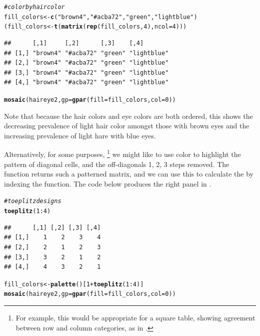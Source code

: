 \documentclass[11pt]{book}\usepackage[]{graphicx}\usepackage[]{color}
\makeatletter
\newcommand{\hlnum}[1]{\textcolor[rgb]{0.686,0.059,0.569}{#1}}%
\newcommand{\hlstr}[1]{\textcolor[rgb]{0.192,0.494,0.8}{#1}}%
\newcommand{\hlcom}[1]{\textcolor[rgb]{0.678,0.584,0.686}{\textit{#1}}}%
\newcommand{\hlopt}[1]{\textcolor[rgb]{0,0,0}{#1}}%
\newcommand{\hlstd}[1]{\textcolor[rgb]{0.345,0.345,0.345}{#1}}%
\newcommand{\hlkwb}[1]{\textcolor[rgb]{0.69,0.353,0.396}{#1}}%
\newcommand{\hlkwc}[1]{\textcolor[rgb]{0.333,0.667,0.333}{#1}}%
\newcommand{\hlkwd}[1]{\textcolor[rgb]{0.737,0.353,0.396}{\textbf{#1}}}%
\newenvironment{kframe}{%
 \def\at@end@of@kframe{}%
 \ifinner\ifhmode%
  \def\at@end@of@kframe{\end{minipage}}%
  \begin{minipage}{\columnwidth}%
 \fi\fi%
 \def\FrameCommand##1{\hskip\@totalleftmargin \hskip-\fboxsep
 \colorbox{shadecolor}{##1}\hskip-\fboxsep
     \hskip-\linewidth \hskip-\@totalleftmargin \hskip\columnwidth}%
 \MakeFramed {\advance\hsize-\width
   \@totalleftmargin\z@ \linewidth\hsize
   \@setminipage}}%
 {\par\unskip\endMakeFramed%
 \at@end@of@kframe}
\newenvironment{knitrout}{}{} %
\renewenvironment{knitrout}{\small\renewcommand{\baselinestretch}{.85}}{} %
\makeatother
\begin{document}
\begin{knitrout}
\color{fgcolor}\begin{kframe}
\begin{alltt}
\hlcom{# color by hair color}
\hlstd{fill_colors} \hlkwb{<-} \hlkwd{c}\hlstd{(}\hlstr{"brown4"}\hlstd{,} \hlstr{"#acba72"}\hlstd{,} \hlstr{"green"}\hlstd{,} \hlstr{"lightblue"}\hlstd{)}
\hlstd{(fill_colors} \hlkwb{<-} \hlkwd{t}\hlstd{(}\hlkwd{matrix}\hlstd{(}\hlkwd{rep}\hlstd{(fill_colors,} \hlnum{4}\hlstd{),} \hlkwc{ncol}\hlstd{=}\hlnum{4}\hlstd{)))}
\end{alltt}
\begin{verbatim}
##      [,1]     [,2]      [,3]    [,4]       
## [1,] "brown4" "#acba72" "green" "lightblue"
## [2,] "brown4" "#acba72" "green" "lightblue"
## [3,] "brown4" "#acba72" "green" "lightblue"
## [4,] "brown4" "#acba72" "green" "lightblue"
\end{verbatim}
\begin{alltt}
\hlkwd{mosaic}\hlstd{(haireye2,} \hlkwc{gp}\hlstd{=}\hlkwd{gpar}\hlstd{(}\hlkwc{fill}\hlstd{=fill_colors,} \hlkwc{col}\hlstd{=}\hlnum{0}\hlstd{))}
\end{alltt}
\end{kframe}
\end{knitrout}

\noindent Note that because the hair colors and eye colors are both ordered,
this shows the decreasing prevalence of light hair color amongst those with brown eyes
and the increasing prevalence of light hare with blue eyes.

Alternatively, for some purposes,%
\footnote{
For example, this would be appropriate for a square table, showing agreement between
row and column categories, as in .
}
we might like to use color to highlight the pattern
of diagonal cells, and the off-diagonals 1, 2, 3 steps removed.
The \R function  returns such a patterned matrix, and we can use this
to calculate the  by indexing the  function.  The code below produces the right panel in 
.
\begin{knitrout}
\color{fgcolor}\begin{kframe}
\begin{alltt}
\hlcom{# toeplitz designs}
\hlkwd{toeplitz}\hlstd{(}\hlnum{1}\hlopt{:}\hlnum{4}\hlstd{)}
\end{alltt}
\begin{verbatim}
##      [,1] [,2] [,3] [,4]
## [1,]    1    2    3    4
## [2,]    2    1    2    3
## [3,]    3    2    1    2
## [4,]    4    3    2    1
\end{verbatim}
\begin{alltt}
\hlstd{fill_colors} \hlkwb{<-} \hlkwd{palette}\hlstd{()[}\hlnum{1}\hlopt{+}\hlkwd{toeplitz}\hlstd{(}\hlnum{1}\hlopt{:}\hlnum{4}\hlstd{)]}
\hlkwd{mosaic}\hlstd{(haireye2,} \hlkwc{gp}\hlstd{=}\hlkwd{gpar}\hlstd{(}\hlkwc{fill}\hlstd{=fill_colors,} \hlkwc{col}\hlstd{=}\hlnum{0}\hlstd{))}
\end{alltt}
\end{kframe}
\end{knitrout}
\end{document}
